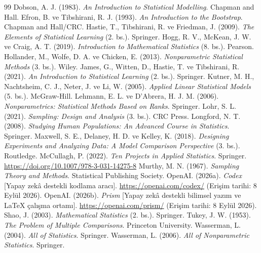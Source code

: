 \begin{thebibliography}{99}
 Dobson, A. J. (1983). \textit{An Introduction to Statistical Modelling}. Chapman and Hall.
 Efron, B. ve Tibshirani, R. J. (1993). \textit{An Introduction to the Bootstrap}. Chapman and Hall/CRC.
 Hastie, T., Tibshirani, R. ve Friedman, J. (2009). \textit{The Elements of Statistical Learning} (2. bs.). Springer.
 Hogg, R. V., McKean, J. W. ve Craig, A. T. (2019). \textit{Introduction to Mathematical Statistics} (8. bs.). Pearson.
 Hollander, M., Wolfe, D. A. ve Chicken, E. (2013). \textit{Nonparametric Statistical Methods} (3. bs.). Wiley.
 James, G., Witten, D., Hastie, T. ve Tibshirani, R. (2021). \textit{An Introduction to Statistical Learning} (2. bs.). Springer.
 Kutner, M. H., Nachtsheim, C. J., Neter, J. ve Li, W. (2005). \textit{Applied Linear Statistical Models} (5. bs.). McGraw-Hill.
 Lehmann, E. L. ve D'Abrera, H. J. M. (2006). \textit{Nonparametrics: Statistical Methods Based on Ranks}. Springer.
 Lohr, S. L. (2021). \textit{Sampling: Design and Analysis} (3. bs.). CRC Press.
 Longford, N. T. (2008). \textit{Studying Human Populations: An Advanced Course in Statistics}. Springer.
 Maxwell, S. E., Delaney, H. D. ve Kelley, K. (2018). \textit{Designing Experiments and Analyzing Data: A Model Comparison Perspective} (3. bs.). Routledge.
 McCullagh, P. (2022). \textit{Ten Projects in Applied Statistics}. Springer. \url{https://doi.org/10.1007/978-3-031-14275-8}
 Murthy, M. N. (1967). \textit{Sampling Theory and Methods}. Statistical Publishing Society.
 OpenAI. (2026a). \textit{Codex} [Yapay zekâ destekli kodlama aracı]. \url{https://openai.com/codex/} (Erişim tarihi: 8 Eylül 2026).
 OpenAI. (2026b). \textit{Prism} [Yapay zekâ destekli bilimsel yazım ve \LaTeX{} çalışma ortamı]. \url{https://openai.com/prism/} (Erişim tarihi: 8 Eylül 2026).
 Shao, J. (2003). \textit{Mathematical Statistics} (2. bs.). Springer.
 Tukey, J. W. (1953). \textit{The Problem of Multiple Comparisons}. Princeton University.
 Wasserman, L. (2004). \textit{All of Statistics}. Springer.
 Wasserman, L. (2006). \textit{All of Nonparametric Statistics}. Springer.
\end{thebibliography}